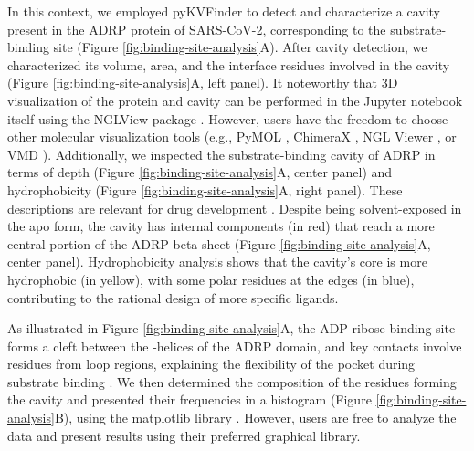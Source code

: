 \documentclass[Ingles]{phdthesis}
\def\eg{e.g.\onedot}
\begin{document}
In this context, we employed pyKVFinder to detect and characterize a cavity present in the \acs{ADRP} protein of \acs{SARS-CoV-2}, corresponding to the substrate-binding site (Figure \ref{fig:binding-site-analysis}A). After cavity detection, we characterized its volume, area, and the interface residues involved in the cavity (Figure \ref{fig:binding-site-analysis}A, left panel). It noteworthy that 3D visualization of the protein and cavity can be performed in the Jupyter notebook itself using the NGLView package \cite{nglview}. However, users have the freedom to choose other molecular visualization tools (\eg, PyMOL \cite{pymol}, ChimeraX \cite{chimerax}, NGL Viewer \cite{nglviewer}, or VMD \cite{vmd}). Additionally, we inspected the substrate-binding cavity of ADRP in terms of depth (Figure \ref{fig:binding-site-analysis}A, center panel) and hydrophobicity (Figure \ref{fig:binding-site-analysis}A, right panel). These descriptions are relevant for drug development \cite{brosey2021}. Despite being solvent-exposed in the apo form, the cavity has internal components (in red) that reach a more central portion of the ADRP beta-sheet (Figure \ref{fig:binding-site-analysis}A, center panel). Hydrophobicity analysis shows that the cavity's core is more hydrophobic (in yellow), with some polar residues at the edges (in blue), contributing to the rational design of more specific ligands.

As illustrated in Figure \ref{fig:binding-site-analysis}A, the ADP-ribose binding site forms a cleft between the \textalpha-helices of the \acs{ADRP} domain, and key contacts involve residues from loop regions, explaining the flexibility of the pocket during substrate binding \cite{michalska2020}. We then determined the composition of the residues forming the cavity and presented their frequencies in a histogram (Figure \ref{fig:binding-site-analysis}B), using the matplotlib library \cite{matplotlib}. However, users are free to analyze the data and present results using their preferred graphical library.
\end{document}
